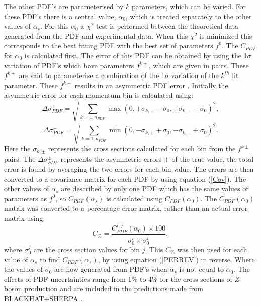 \documentclass[12pt, onecolumn, nofootinbib]{revtex4}    %
\begin{document}
{The other PDF's are parameterised by ${k}$ parameters, which can be varied. For these PDF's there is a central value, ${\alpha_0}$, which is treated separately to the other values of ${\alpha_s}$. For this ${\alpha_0}$ a ${\chi^2}$ test is performed between the theoretical data generated from the PDF and experimental data. When this ${\chi^2}$ is minimized this corresponds to the best fitting PDF with the best set of parameters ${f^0}$. The ${C_{PDF}}$ for  ${\alpha_0}$ is calculated first. The error of this PDF can be obtained by using the 1${\sigma}$ variation of PDF's which have parameters ${f^{k\pm}}$, which are given in pairs. These ${f^{k \pm}}$ are said to parameterise a combination of the 1${\sigma}$ variation of the ${k^{th}}$ fit parameter. These ${f^{k \pm}}$ results in an asymmetric PDF error \cite{CPDF}. Initially the asymmetric error for each momentum bin is calculated using: \begin{equation} \Delta\sigma^+_{PDF} = \sqrt{\sum_{k=1,n_{PDF}} {\max(0, +\sigma_{k,+} - \sigma_0, +\sigma_{k,-} -\sigma_0)^2}}, \end{equation}  \begin{equation} \Delta\sigma^-_{PDF} = \sqrt{\sum_{k=1,n_{PDF}} {\min(0, -\sigma_{k,+} + \sigma_0, -\sigma_{k,-} +\sigma_0)^2}}. \end{equation} Here the ${\sigma_{k,\pm}}$ represents the cross sections calculated for each bin from the ${f^{k \pm}}$ pairs. The  ${\Delta\sigma^\pm_{PDF}}$ represents the asymmetric errors ${\pm}$ of the true value, the total error is found by averaging the two errors for each bin value. The errors are then converted to a covariance matrix for each PDF by using equation (\ref{Cov}). The other values of ${\alpha_s}$ are described by only one PDF which has the same values of parameters as ${f^0}$, so ${C_{PDF}(\alpha_s)}$ is calculated using ${C_{PDF}(\alpha_0)}$. The ${C_{PDF}(\alpha_0)}$ matrix was converted to a percentage error matrix, rather than an actual error matrix using: \begin{equation} \label{PERREV} C_{\%} = \dfrac{C_{PDF}^{i,j}(\alpha_0) \times 100}{ \sigma_{0}^{i} \times  \sigma_{0}^{j}}, \end{equation} where ${\sigma_0^j}$ are the cross section values for bin ${j}$. This ${C_{\%}}$ was then used for each value of ${\alpha_s}$ to find ${C_{PDF}(\alpha_s)}$, by using equation (\ref{PERREV}) in reverse. Where the values of ${\sigma_{0}}$ are now generated from PDF's when ${\alpha_s}$ is not equal to ${\alpha_0}$. The effects of PDF uncertainties range from 1\% to 4\% for the cross-sections of ${Z}$-boson production and are included in the predictions made from BLACKHAT+SHERPA \cite{HEPP}.
 


}
\end{document}
